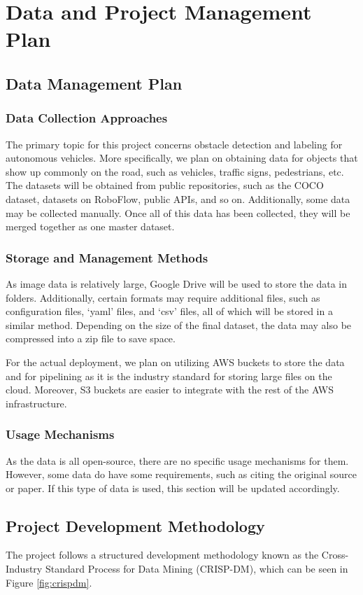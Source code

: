 \documentclass[stu,12pt,floatsintext]{apa7}
\begin{document}
\section{Data and Project Management Plan}
\subsection{Data Management Plan}
\subsubsection{Data Collection Approaches}
The primary topic for this project concerns obstacle detection and labeling for autonomous vehicles. More specifically, we plan on obtaining data for objects that show up commonly on the road, such as vehicles, traffic signs, pedestrians, etc.
The datasets will be obtained from public repositories, such as the COCO dataset, datasets on RoboFlow, public APIs, and so on. Additionally, some data may be collected manually. Once all of this data has been collected, they will be merged together as one master dataset.

\subsubsection{Storage and Management Methods}
As image data is relatively large, Google Drive will be used to store the data in folders. Additionally, certain formats may require additional files, such as configuration files, `yaml' files, and `csv' files, all of which will be stored in a similar method. Depending on the size of the final dataset, the data may also be compressed into a zip file to save space. 

For the actual deployment, we plan on utilizing AWS buckets to store the data and for pipelining as it is the industry standard for storing large files on the cloud. Moreover, S3 buckets are easier to integrate with the rest of the AWS infrastructure.

\subsubsection{Usage Mechanisms}
As the data is all open-source, there are no specific usage mechanisms for them. However, some data do have some requirements, such as citing the original source or paper. If this type of data is used, this section will be updated accordingly.


\subsection{Project Development Methodology}
The project follows a structured development methodology known as the Cross-Industry Standard Process for Data Mining (CRISP-DM), which can be seen in Figure \ref{fig:crispdm}. 
\end{document}
